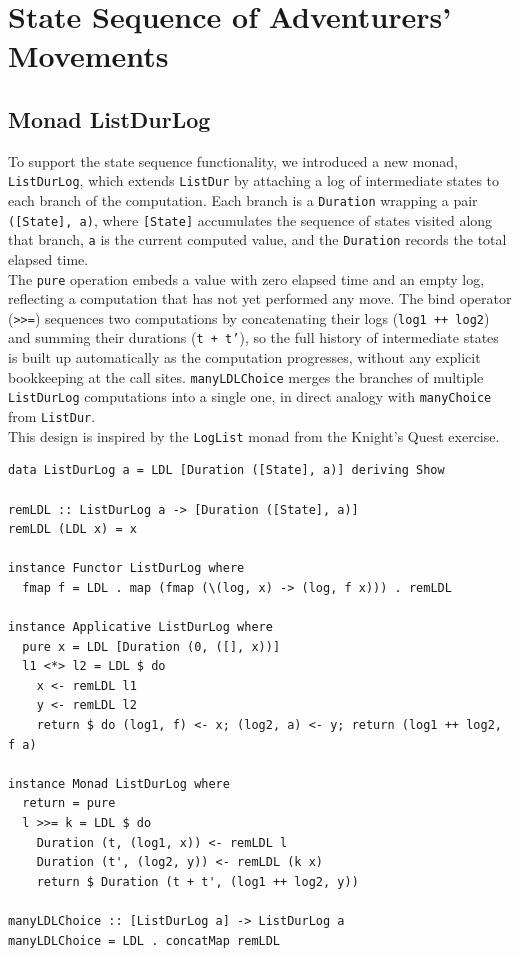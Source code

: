 \documentclass[a4paper,12pt]{report}
\begin{document}
\section{State Sequence of Adventurers' Movements}
\subsection{Monad ListDurLog}
To support the state sequence functionality, we introduced a new monad, \texttt{ListDurLog},
which extends \texttt{ListDur} by attaching a log of intermediate states to each branch
of the computation. Each branch is a \texttt{Duration} wrapping a pair
\texttt{([State], a)}, where \texttt{[State]} accumulates the sequence of states visited
along that branch, \texttt{a} is the current computed value, and the \texttt{Duration}
records the total elapsed time.
\\[1em]
The \texttt{pure} operation embeds a value with zero elapsed time and an empty log,
reflecting a computation that has not yet performed any move. The bind operator
(\texttt{>>=}) sequences two computations by concatenating their logs
(\texttt{log1 ++ log2}) and summing their durations (\texttt{t + t'}), so the full
history of intermediate states is built up automatically as the computation progresses,
without any explicit bookkeeping at the call sites. \texttt{manyLDLChoice} merges the
branches of multiple \texttt{ListDurLog} computations into a single one, in direct
analogy with \texttt{manyChoice} from \texttt{ListDur}.
\\[1em]
This design is inspired by the \texttt{LogList} monad from the Knight's Quest exercise.
\begin{verbatim}
data ListDurLog a = LDL [Duration ([State], a)] deriving Show

remLDL :: ListDurLog a -> [Duration ([State], a)]
remLDL (LDL x) = x

instance Functor ListDurLog where
  fmap f = LDL . map (fmap (\(log, x) -> (log, f x))) . remLDL

instance Applicative ListDurLog where
  pure x = LDL [Duration (0, ([], x))]
  l1 <*> l2 = LDL $ do
    x <- remLDL l1
    y <- remLDL l2
    return $ do (log1, f) <- x; (log2, a) <- y; return (log1 ++ log2, f a)

instance Monad ListDurLog where
  return = pure
  l >>= k = LDL $ do
    Duration (t, (log1, x)) <- remLDL l
    Duration (t', (log2, y)) <- remLDL (k x)
    return $ Duration (t + t', (log1 ++ log2, y))

manyLDLChoice :: [ListDurLog a] -> ListDurLog a
manyLDLChoice = LDL . concatMap remLDL
\end{verbatim}
\end{document}
